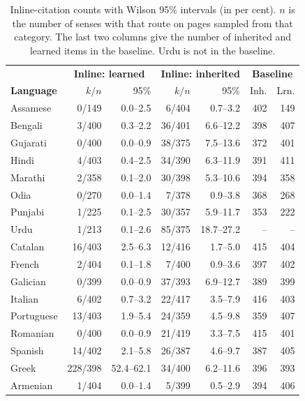\documentclass[11pt]{article}
\begin{document}
\begin{table}[h]
\centering\footnotesize
\setlength{\tabcolsep}{1.2pt}
\begin{tabular}{lrrrrrr}
\toprule
& \multicolumn{2}{c}{\textbf{Inline: learned}} & \multicolumn{2}{c}{\textbf{Inline: inherited}} & \multicolumn{2}{c}{\textbf{Baseline}} \\
\textbf{Language} & $k/n$ & 95\% & $k/n$ & 95\% & Inh. & Lrn. \\
\midrule
Assamese & 0/149 & 0.0--2.5 & 6/404 & 0.7--3.2 & 402 & 149 \\
Bengali & 3/400 & 0.3--2.2 & 36/401 & 6.6--12.2 & 398 & 407 \\
Gujarati & 0/400 & 0.0--0.9 & 38/375 & 7.5--13.6 & 372 & 401 \\
Hindi & 4/403 & 0.4--2.5 & 34/390 & 6.3--11.9 & 391 & 411 \\
Marathi & 2/358 & 0.1--2.0 & 30/398 & 5.3--10.6 & 394 & 358 \\
Odia & 0/270 & 0.0--1.4 & 7/378 & 0.9--3.8 & 368 & 268 \\
Punjabi & 1/225 & 0.1--2.5 & 30/357 & 5.9--11.7 & 353 & 222 \\
Urdu & 1/213 & 0.1--2.6 & 85/375 & 18.7--27.2 & -- & -- \\
\midrule
Catalan & 16/403 & 2.5--6.3 & 12/416 & 1.7--5.0 & 415 & 404 \\
French & 2/404 & 0.1--1.8 & 7/400 & 0.9--3.6 & 397 & 402 \\
Galician & 0/399 & 0.0--0.9 & 37/393 & 6.9--12.7 & 389 & 399 \\
Italian & 6/402 & 0.7--3.2 & 22/417 & 3.5--7.9 & 416 & 403 \\
Portuguese & 13/403 & 1.9--5.4 & 24/359 & 4.5--9.8 & 359 & 407 \\
Romanian & 0/400 & 0.0--0.9 & 21/419 & 3.3--7.5 & 415 & 401 \\
Spanish & 14/402 & 2.1--5.8 & 26/387 & 4.6--9.7 & 387 & 405 \\
\midrule
Greek & 228/398 & 52.4--62.1 & 34/400 & 6.2--11.6 & 396 & 393 \\
\midrule
Armenian & 1/404 & 0.0--1.4 & 5/399 & 0.5--2.9 & 394 & 406 \\
\bottomrule
\end{tabular}
\caption{Inline-citation counts with Wilson 95\% intervals (in per cent). $n$ is the number of senses with that route on pages sampled from that category. The last two columns give the number of inherited and learned items in the baseline. Urdu is not in the baseline.}
\label{tab:denominators}
\end{table}
\end{document}
